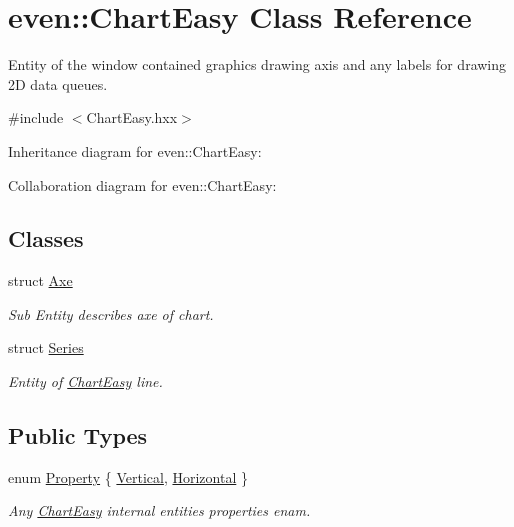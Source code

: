 \hypertarget{classeven_1_1_chart_easy}{}\section{even\+:\+:Chart\+Easy Class Reference}
\label{classeven_1_1_chart_easy}


Entity of the window contained graphics drawing axis and any labels for drawing 2D data queues.  




{\ttfamily \#include $<$Chart\+Easy.\+hxx$>$}



Inheritance diagram for even\+:\+:Chart\+Easy\+:


Collaboration diagram for even\+:\+:Chart\+Easy\+:
\subsection*{Classes}
\begin{DoxyCompactItemize}
\item 
struct \mbox{\hyperlink{structeven_1_1_chart_easy_1_1_axe}{Axe}}
\begin{DoxyCompactList}\small\item\em Sub Entity describes axe of chart. \end{DoxyCompactList}\item 
struct \mbox{\hyperlink{structeven_1_1_chart_easy_1_1_series}{Series}}
\begin{DoxyCompactList}\small\item\em Entity of \mbox{\hyperlink{classeven_1_1_chart_easy}{Chart\+Easy}} line. \end{DoxyCompactList}\end{DoxyCompactItemize}
\subsection*{Public Types}
\begin{DoxyCompactItemize}
\item 
enum \mbox{\hyperlink{classeven_1_1_chart_easy_a3a647749c693d508d8af5a039f4f8848}{Property}} \{ \mbox{\hyperlink{classeven_1_1_chart_easy_a3a647749c693d508d8af5a039f4f8848a172e0ac78844af6ef8b18f01ee58d361}{Vertical}}, 
\mbox{\hyperlink{classeven_1_1_chart_easy_a3a647749c693d508d8af5a039f4f8848a6635c6b4db87a9c90e5bf12ed8ed37ce}{Horizontal}}
 \}
\begin{DoxyCompactList}\small\item\em Any \mbox{\hyperlink{classeven_1_1_chart_easy}{Chart\+Easy}} internal entities properties enam. \end{DoxyCompactList}\end{DoxyCompactItemize}
